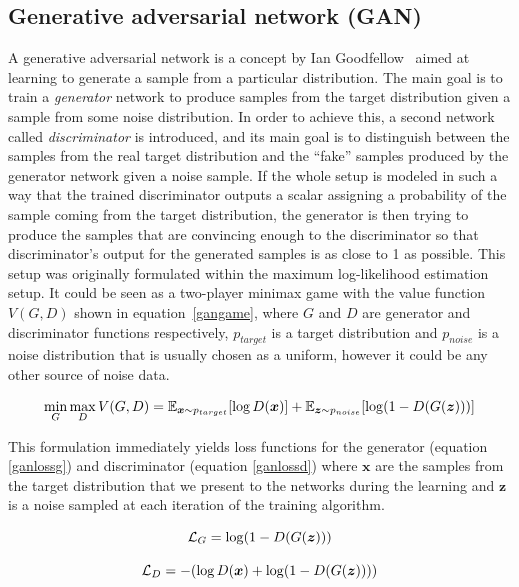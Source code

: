 \subsection{Generative adversarial network (GAN)}

A generative adversarial network is a concept by Ian Goodfellow~\cite{origgan} aimed at learning to generate a sample from a particular distribution. The main goal is to train a {\em generator} network to produce samples from the target distribution given a sample from some noise distribution. In order to achieve this, a second network called {\em discriminator} is introduced, and its main goal is to distinguish between the samples from the real target distribution and the ``fake'' samples produced by the generator network given a noise sample. If the whole setup is modeled in such a way that the trained discriminator outputs a scalar assigning a probability of the sample coming from the target distribution, the generator is then trying to produce the samples that are convincing enough to the discriminator so that discriminator's output for the generated samples is as close to 1 as possible. This setup was originally formulated within the maximum log-likelihood estimation setup. It could be seen as a two-player minimax game with the value function $V(G, D)$ shown in equation~\ref{gangame}, where $G$ and $D$ are generator and discriminator functions respectively, $p_{target}$ is a target distribution and $p_{noise}$ is a noise distribution that is usually chosen as a uniform, however it could be any other source of noise data.

\begin{equation}
\min_G \max_D V(G, D) = \operatorname{\mathbb{E}}_{\bm{x}\sim p_{target}}[\log D(\bm{x})] + \operatorname{\mathbb{E}}_{\bm{z}\sim p_{noise}} [\log(1 - D(G(\bm{z})))]
\label{gangame}
\end{equation}

This formulation immediately yields loss functions for the generator (equation \ref{ganlossg}) and discriminator (equation \ref{ganlossd}) where $\bm{x}$ are the samples from the target distribution that we present to the networks during the learning and $\bm{z}$ is a noise sampled at each iteration of the training algorithm.

\begin{equation}
\mathcal{L}_G = \log(1 - D(G(\bm{z})))
\label{ganlossg}
\end{equation}

\begin{equation}
\mathcal{L}_D = - (\log D(\bm{x}) + \log(1 - D(G(\bm{z}))))
\label{ganlossd}
\end{equation}

